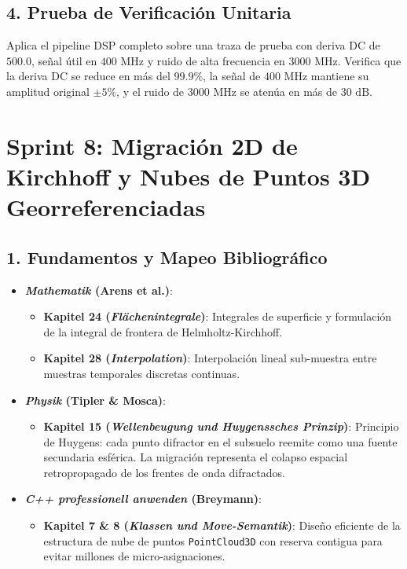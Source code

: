 \documentclass[11pt,a4paper]{article}
\begin{document}
\subsection{4. Prueba de Verificación Unitaria}
Aplica el pipeline DSP completo sobre una traza de prueba con deriva DC de $500.0$, señal útil en $400\text{ MHz}$ y ruido de alta frecuencia en $3000\text{ MHz}$.
Verifica que la deriva DC se reduce en más del $99.9\%$, la señal de $400\text{ MHz}$ mantiene su amplitud original $\pm 5\%$, y el ruido de $3000\text{ MHz}$ se atenúa en más de $30\text{ dB}$.

\section{Sprint 8: Migración 2D de Kirchhoff y Nubes de Puntos 3D Georreferenciadas}

\subsection{1. Fundamentos y Mapeo Bibliográfico}
\begin{itemize}
    \item \textbf{\textit{Mathematik} (Arens et al.)}:
    \begin{itemize}
        \item \textbf{Kapitel 24 (\textit{Flächenintegrale})}: Integrales de superficie y formulación de la integral de frontera de Helmholtz-Kirchhoff.
        \item \textbf{Kapitel 28 (\textit{Interpolation})}: Interpolación lineal sub-muestra entre muestras temporales discretas continuas.
    \end{itemize}
    \item \textbf{\textit{Physik} (Tipler \& Mosca)}:
    \begin{itemize}
        \item \textbf{Kapitel 15 (\textit{Wellenbeugung und Huygenssches Prinzip})}: Principio de Huygens: cada punto difractor en el subsuelo reemite como una fuente secundaria esférica. La migración representa el colapso espacial retropropagado de los frentes de onda difractados.
    \end{itemize}
    \item \textbf{\textit{C++ professionell anwenden} (Breymann)}:
    \begin{itemize}
        \item \textbf{Kapitel 7 \& 8 (\textit{Klassen und Move-Semantik})}: Diseño eficiente de la estructura de nube de puntos \texttt{PointCloud3D} con reserva contigua para evitar millones de micro-asignaciones.
    \end{itemize}
\end{itemize}
\end{document}
